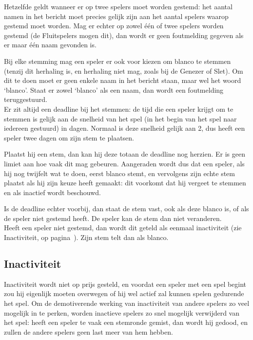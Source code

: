 \documentclass[12pt]{article}
\begin{document}
    Hetzelfde geldt wanneer er op twee spelers moet worden gestemd: het aantal namen in het bericht moet precies gelijk zijn aan het aantal spelers waarop gestemd moet worden. Mag er echter op zowel \'e\'en of twee spelers worden gestemd (de Fluitspelers mogen dit), dan wordt er geen foutmelding gegeven als er maar \'e\'en naam gevonden is.
    
    Bij elke stemming mag een speler er ook voor kiezen om blanco te stemmen (tenzij dit herhaling is, en herhaling niet mag, zoals bij de Genezer of Slet). Om dit te doen moet er geen enkele naam in het bericht staan, maar wel het woord `blanco'. Staat er zowel `blanco' als een naam, dan wordt een foutmelding teruggestuurd.
    \\[\baselineskip]
    Er zit altijd een deadline bij het stemmen: de tijd die een speler krijgt om te stemmen is gelijk aan de snelheid van het spel (in het begin van het spel naar iedereen gestuurd) in dagen. Normaal is deze snelheid gelijk aan 2, dus heeft een speler twee dagen om zijn stem te plaatsen. 
    
    Plaatst hij een stem, dan kan hij deze totaan de deadline nog herzien. Er is geen limiet aan hoe vaak dit mag gebeuren. Aangeraden wordt dus dat een speler, als hij nog twijfelt wat te doen, eerst blanco stemt, en vervolgens zijn echte stem plaatst als hij zijn keuze heeft gemaakt: dit voorkomt dat hij vergeet te stemmen en als inactief wordt beschouwd.
    
    Is de deadline echter voorbij, dan staat de stem vast, ook als deze blanco is, of als de speler niet gestemd heeft. De speler kan de stem dan niet veranderen.
    \\[\baselineskip]
    Heeft een speler niet gestemd, dan wordt dit geteld als eenmaal inactiviteit (zie Inactiviteit, op pagina~\pageref{subsec:inactiviteit}). Zijn stem telt dan als blanco.
  
  \subsection{Inactiviteit} \label{subsec:inactiviteit}
  
    Inactiviteit wordt niet op prijs gesteld, en voordat een speler met een spel begint zou hij eigenlijk moeten overwegen of hij wel actief zal kunnen spelen gedurende het spel. Om de demotiverende werking van inactiviteit van andere spelers zo veel mogelijk in te perken, worden inactieve spelers zo snel mogelijk verwijderd van het spel: heeft een speler te vaak een stemronde gemist, dan wordt hij gedood, en zullen de andere spelers geen last meer van hem hebben.
    
\end{document}
